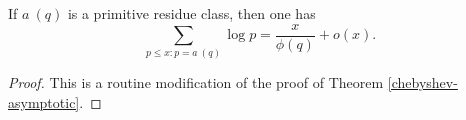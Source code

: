 \begin{theorem}
\label{chebyshev-asymptotic-pnt}
\leanok
If $a\ (q)$ is a primitive residue class, then one has
  $$ \sum_{p \leq x: p = a\ (q)} \log p = \frac{x}{\phi(q)} + o(x).$$
\end{theorem}
\begin{proof}
\leanok
This is a routine modification of the proof of Theorem \ref{chebyshev-asymptotic}.
\end{proof}
